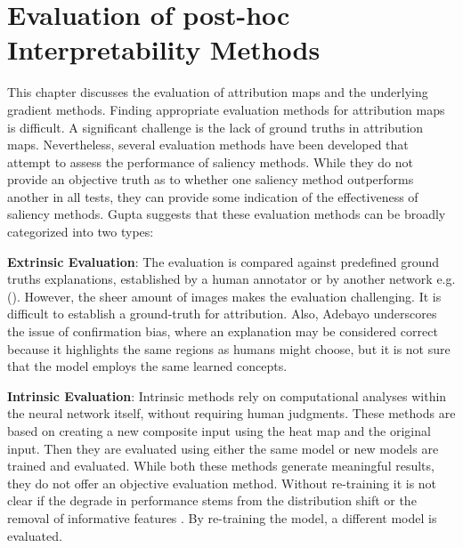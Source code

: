 \newpage

\chapter{Evaluation of post-hoc Interpretability Methods}
\label{sec:evaluation}


This chapter discusses the evaluation of attribution maps and the underlying gradient methods. Finding appropriate evaluation methods for attribution maps is difficult. A significant challenge is the lack of ground truths in attribution maps. Nevertheless, several evaluation methods have been developed that attempt to assess the performance of saliency methods. While they do not provide an objective truth as to whether one saliency method outperforms another in all tests, they can provide some indication of the effectiveness of saliency methods. Gupta\cite{gupta2022new} suggests that these evaluation methods can be broadly categorized into two types:

\textbf{Extrinsic Evaluation}: 
The evaluation is compared against predefined ground truths explanations, established by a human annotator or by another network e.g.(\cite{zhang2018}). However, the sheer amount of images makes the evaluation challenging. It is difficult to establish a ground-truth for attribution. Also, Adebayo \cite{adebayo2020sanity} underscores the issue of confirmation bias, where an explanation may be considered correct because it highlights the same regions as humans might choose, but it is not sure that the model employs the same learned concepts. 

\textbf{Intrinsic Evaluation}: 
Intrinsic methods rely on computational analyses within the neural network itself, without requiring human judgments. These methods are based on creating a new composite input using the heat map and the original input. Then they are evaluated using either the same model\cite{dabkowski2017real} or new models are trained and evaluated\cite{hooker2019benchmark}. While both these methods generate meaningful results, they do not offer an objective evaluation method. Without re-training it is not clear if the degrade in performance stems from the distribution shift or the removal of informative features \cite{hooker2019benchmark}. By re-training the model, a different model is evaluated. 
\\

